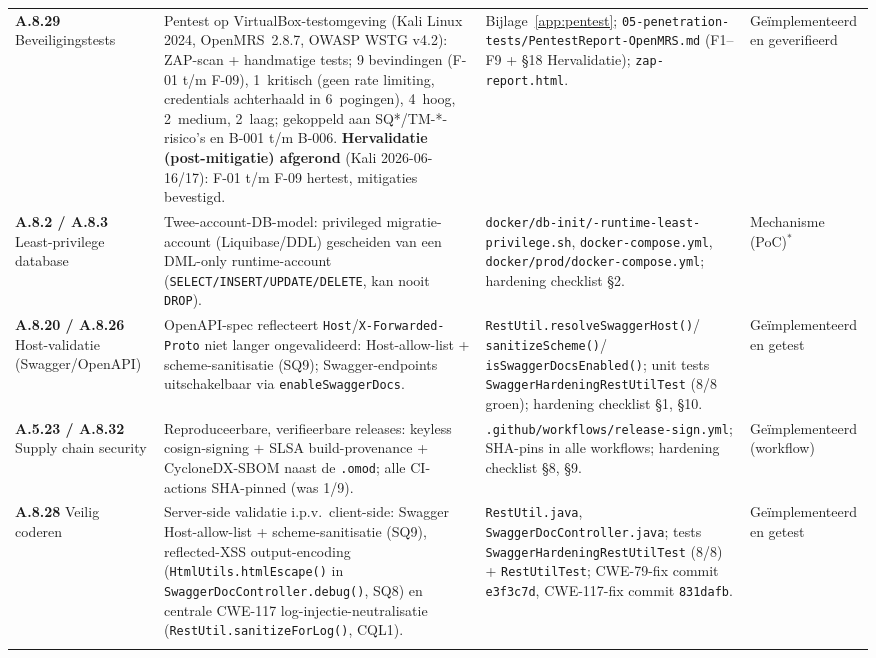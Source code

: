 \documentclass[12pt, a4paper]{report}
\begin{document}
{\begin{longtable}{@{}
    >{\raggedright\arraybackslash}p{2.0cm}
    >{\raggedright\arraybackslash}p{4.3cm}
    >{\raggedright\arraybackslash}p{6.2cm}
    >{\raggedright\arraybackslash}p{2.0cm}@{}}
\textbf{A.8.29} Beveiligings\-tests &
Pentest op VirtualBox-testomgeving (Kali Linux 2024, OpenMRS~2.8.7, OWASP WSTG v4.2):
ZAP-scan + handmatige tests; 9 bevindingen (F-01 t/m F-09), 1~kritisch (geen
rate limiting, credentials achterhaald in 6~pogingen), 4~hoog, 2~medium, 2~laag;
gekoppeld aan SQ*/TM-*-risico's en B-001 t/m B-006. \textbf{Hervalidatie
(post-mitigatie) afgerond} (Kali 2026-06-16/17): F-01 t/m F-09 hertest,
mitigaties bevestigd. &
Bijlage~\ref{app:pentest}; \texttt{05-penetration-tests/\allowbreak PentestReport-OpenMRS.md}
(F1--F9 + \S18 Hervalidatie); \texttt{zap-report.html}. &
Geïmplementeerd en geverifieerd \\
\addlinespace

\textbf{A.8.2 / A.8.3} Least-privilege database &
Twee-account-DB-model: privileged migratie-account (Liquibase/DDL)
gescheiden van een DML-only runtime-account
(\texttt{SELECT/INSERT/UPDATE/DELETE}, kan nooit \texttt{DROP}). &
\texttt{docker/\allowbreak db-init/\allowbreak 10-runtime-least-privilege.sh},
\texttt{docker-compose.yml}, \texttt{docker/\allowbreak prod/\allowbreak docker-compose.yml};
hardening checklist \S2. &
Mechanisme (PoC)$^\ast$ \\
\addlinespace

\textbf{A.8.20 / A.8.26} Host-validatie (Swagger/OpenAPI) &
OpenAPI-spec reflecteert \texttt{Host}/\texttt{X-Forwarded-Proto} niet langer
ongevalideerd: Host-allow-list + scheme-sanitisatie (SQ9); Swagger-endpoints
uitschakelbaar via \texttt{enableSwaggerDocs}. &
\texttt{RestUtil.\allowbreak resolveSwaggerHost()}/\allowbreak
\texttt{sanitizeScheme()}/\allowbreak
\texttt{isSwaggerDocsEnabled()}; unit tests
\texttt{SwaggerHardeningRestUtilTest} (8/8 groen); hardening checklist
\S1, \S10. &
Geïmplementeerd en getest \\
\addlinespace

\textbf{A.5.23 / A.8.32} Supply chain security &
Reproduceerbare, verifieerbare releases: keyless cosign-signing + SLSA
build-provenance + CycloneDX-SBOM naast de \texttt{.omod}; alle CI-actions
SHA-pinned (was 1/9). &
\texttt{.github/\allowbreak workflows/\allowbreak release-sign.yml}; SHA-pins in alle workflows;
hardening checklist \S8, \S9. &
Geïmplementeerd (workflow) \\
\addlinespace

\textbf{A.8.28} Veilig coderen &
Server-side validatie i.p.v.\ client-side: Swagger Host-allow-list +
scheme-sanitisatie (SQ9), reflected-XSS output-encoding
(\texttt{HtmlUtils.htmlEscape()} in \texttt{SwaggerDocController.debug()}, SQ8)
en centrale CWE-117 log-injectie-neutralisatie
(\texttt{RestUtil.sanitizeForLog()}, CQL1). &
\texttt{RestUtil.java}, \texttt{SwaggerDocController.java}; tests
\texttt{SwaggerHardeningRestUtilTest} (8/8) + \texttt{RestUtilTest}; CWE-79-fix
commit \texttt{e3f3c7d}, CWE-117-fix commit \texttt{831dafb}. &
Geïmplementeerd en getest \\
\addlinespace


\end{longtable}}
\end{document}
